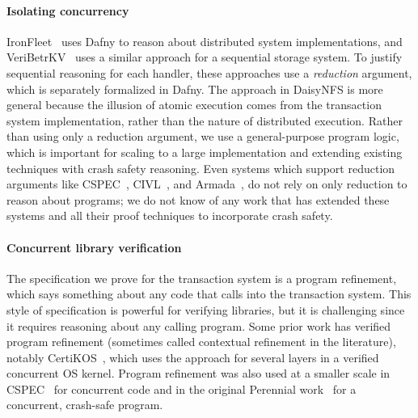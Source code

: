 \paragraph{Isolating concurrency}
IronFleet~\cite{hawblitzel:ironfleet} uses Dafny to reason about distributed
system implementations, and VeriBetrKV~\cite{hance:veribetrkv} uses a similar
approach for a sequential storage system. To justify sequential reasoning for
each handler, these approaches use a \emph{reduction} argument, which is
separately formalized in Dafny. The approach in DaisyNFS is more general because the
illusion of atomic execution comes from the transaction system implementation,
rather than the nature of distributed execution. Rather than using only a
reduction argument, we use a general-purpose program logic, which is important
for scaling to a large implementation and extending existing techniques with
crash safety reasoning. Even systems which support reduction arguments like
CSPEC~\cite{chajed:cspec}, CIVL~\cite{hawblitzel:civl}, and
Armada~\cite{lorch:armada}, do not rely on only reduction to reason about
programs; we do not know of any work that has extended these systems and all
their proof techniques to incorporate crash safety.



\paragraph{Concurrent library verification}

The specification we prove for the transaction system is a program refinement,
which says something about any code that calls into the transaction system. This
style of specification is powerful for verifying libraries, but it is
challenging since it requires reasoning about any calling program. Some prior
work has verified program refinement (sometimes called contextual refinement in
the literature), notably CertiKOS~\cite{gu:certikos-ccal}, which uses the
approach for several layers in a verified concurrent OS kernel. Program
refinement was also used at a smaller scale in CSPEC~\cite{chajed:cspec} for
concurrent code and in the original Perennial work~\cite{chajed:perennial} for a
concurrent, crash-safe program.



